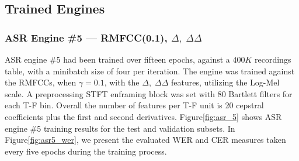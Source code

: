 

\subsection{Trained Engines}
\subsubsection{ASR Engine \#5 --- RMFCC(0.1), \(\Delta,\;\Delta\Delta\)}
ASR engine \#5 had been trained over fifteen epochs,
against a \(400K\) recordings table, with a minibatch size 
of four per iteration. 
The engine was trained against the RMFCCs, 
when \(\gamma=0.1\),
with the \(\Delta,\;\Delta\Delta\) features, utilizing
the Log-Mel scale. A preprocessing STFT enframing
block was set with
80 Bartlett filters for each T-F bin.
Overall the number of features
per T-F unit is 20 cepstral coefficients plus the
first and second derivatives.
Figure\;\ref{fig:asr_5} shows ASR engine \#5 training results
for the test and validation subsets.
In Figure\;\ref{fig:asr5_wer},
we present the evaluated WER and CER measures
taken every five epochs during the training process.

